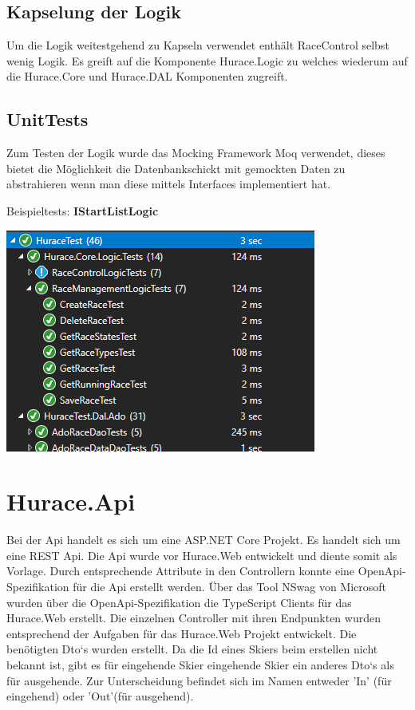 \documentclass[a4paper, 12pt]{article}
\begin{document}
	\subsection{Kapselung der Logik}
	Um die Logik weitestgehend zu Kapseln verwendet enthält RaceControl selbst wenig Logik. Es greift auf die Komponente Hurace.Logic zu welches wiederum auf die Hurace.Core und Hurace.DAL Komponenten zugreift.
	
	\subsection{UnitTests}
	Zum Testen der Logik wurde das Mocking Framework Moq verwendet, dieses bietet die Möglichkeit die Datenbankschickt mit gemockten Daten zu abstrahieren wenn man diese mittels Interfaces implementiert hat.
	
	Beispieltests:
	\textbf{IStartListLogic}
	
	
	
	\includegraphics[width=.7\textwidth]{img/UnitTests2.png}

	\newpage
	
	\section{Hurace.Api}
	Bei der Api handelt es sich um eine ASP.NET Core Projekt. Es handelt sich um eine REST Api. Die Api wurde vor Hurace.Web entwickelt und diente somit als Vorlage. Durch entsprechende Attribute in den Controllern konnte eine OpenApi-Spezifikation für die Api erstellt werden. Über das Tool NSwag von Microsoft wurden über die OpenApi-Spezifikation die TypeScript Clients für das Hurace.Web erstellt. Die einzelnen Controller mit ihren Endpunkten wurden entsprechend der Aufgaben für das Hurace.Web Projekt entwickelt. Die benötigten Dto`s wurden erstellt. Da die Id eines Skiers beim erstellen nicht bekannt ist, gibt es für eingehende Skier eingehende Skier ein anderes Dto`s als für ausgehende. Zur Unterscheidung befindet sich im Namen entweder 'In' (für eingehend) oder 'Out'(für ausgehend). 
\end{document}
